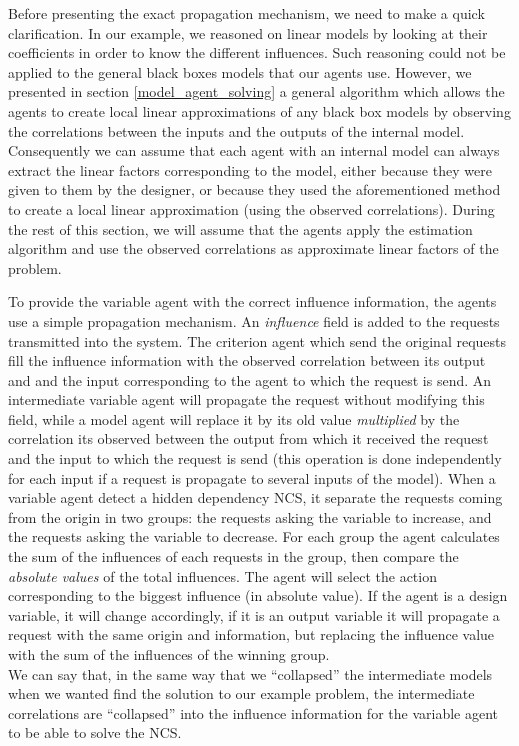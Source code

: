 Before presenting the exact propagation mechanism, we need to make a quick clarification. In our example, we reasoned on linear models by looking at their coefficients in order to know the different influences. Such reasoning could not be applied to the general black boxes models that our agents use. However, we presented in section \ref{model_agent_solving} a general algorithm which allows the agents to create local linear approximations of any black box models by observing the correlations between the inputs and the outputs of the internal model. Consequently we can assume that each agent with an internal model can always extract the linear factors corresponding to the model, either because they were given to them by the designer, or because they used the aforementioned method to create a local linear approximation (using the observed correlations). During the rest of this section, we will assume that the agents apply the estimation algorithm and use the observed correlations as approximate linear factors of the problem.

To provide the variable agent with the correct influence information, the agents use a simple propagation mechanism. An \emph{influence} field is added to the requests transmitted into the system. The criterion agent which send the original requests fill the influence information with the observed correlation between its output and and the input corresponding to the agent to which the request is send. An intermediate variable agent will propagate the request without modifying this field, while a model agent will replace it by its old value \emph{multiplied} by the correlation its observed between the output from which it received the request and the input to which the request is send (this operation is done independently for each input if a request is propagate to several inputs of the model). When a variable agent detect a hidden dependency NCS, it separate the requests coming from the origin in two groups: the requests asking the variable to increase, and the requests asking the variable to decrease. For each group the agent calculates the sum of the influences of each requests in the group, then compare the \emph{absolute values} of the total influences. The agent will select the action corresponding to the biggest influence (in absolute value). If the agent is a design variable, it will change accordingly, if it is an output variable it will propagate a request with the same origin and information, but replacing the influence value with the sum of the influences of the winning group.\\
We can say that, in the same way that we \enquote{collapsed} the intermediate models when we wanted find the solution to our example problem, the intermediate correlations are \enquote{collapsed} into the influence information for the variable agent to be able to solve the NCS.

